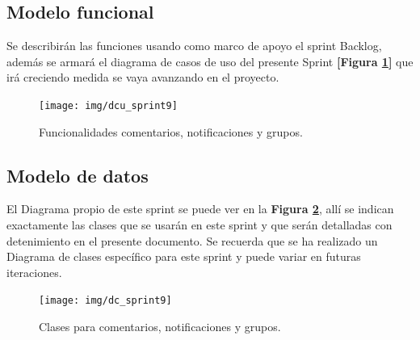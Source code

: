 \subsection{Modelo funcional} 
Se describirán las funciones usando como marco de apoyo el sprint Backlog, además se armará el diagrama de casos de uso del presente Sprint \textbf{[Figura \ref{dcu-sprint-9}]} que irá creciendo  medida se vaya avanzando en el proyecto.

\newpage

    \begin{figure}[h]
        \centering
        \texttt{[image: img/dcu\_sprint9]}
        \caption{Funcionalidades comentarios, notificaciones y grupos.}
		\label{dcu-sprint-9}
    \end{figure}
    
\subsection{Modelo de datos}
El Diagrama propio de este sprint se puede ver en la \textbf{Figura \ref{9-clases_comentario_grupos}}, allí se indican exactamente las clases que se usarán en este sprint y que serán detalladas con detenimiento en el presente documento. Se recuerda que se ha realizado un Diagrama de clases específico para este sprint y puede variar en futuras iteraciones.

    \begin{figure}[h]
        \centering
        \texttt{[image: img/dc\_sprint9]}
        \caption{Clases para comentarios, notificaciones y grupos.}
		\label{9-clases_comentario_grupos}
    \end{figure}

